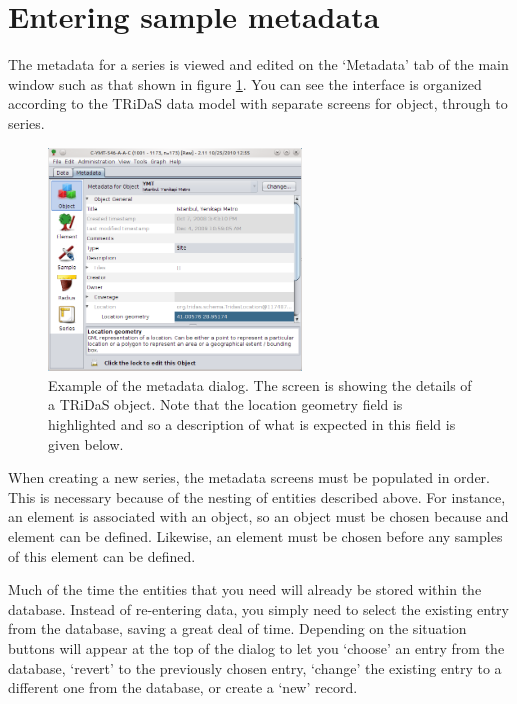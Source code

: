 \section{Entering sample metadata}
The metadata for a series is viewed and edited on the `Metadata' tab of the main window such as that shown in figure \ref{fig:metadata}.  You can see the interface is organized according to the TRiDaS data model with separate screens for object, through to series.  

\begin{figure}
\centering
\includegraphics[width=0.6\textwidth]{Images/metadata.png}
\caption{Example of the metadata dialog.  The screen is showing the details of a TRiDaS object.  Note that the location geometry field is highlighted and so a description of what is expected in this field is given below.} 
\label{fig:metadata}
\end{figure}

When creating a new series, the metadata screens must be populated in order.  This is necessary because of the nesting of entities described above.  For instance, an element is associated with an object, so an object must be chosen because and element can be defined.  Likewise, an element must be chosen before any samples of this element can be defined.  

Much of the time the entities that you need will already be stored within the database.  Instead of re-entering data, you simply need to select the existing entry from the database, saving a great deal of time.  Depending on the situation buttons will appear at the top of the dialog to let you `choose' an entry from the database, `revert' to the previously chosen entry, `change' the existing entry to a different one from the database, or create a `new' record.

